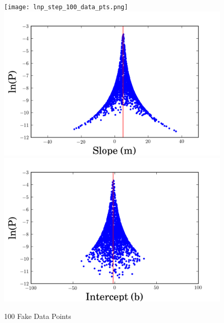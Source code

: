 \documentclass[english,12pt]{article}
\begin{document}
\begin{figure}[H]
\caption{100 Fake Data Points}
  \texttt{[image: lnp\_step\_100\_data\_pts.png]}
\endminipage\hfill
{}
  \includegraphics[width=\linewidth]{lnp_m_100_data_points.png}
\endminipage\hfill
{}%
  \includegraphics[width=\linewidth]{lnp_b_100_data_points.png}
\endminipage\hfill
\end{figure}
\end{document}
